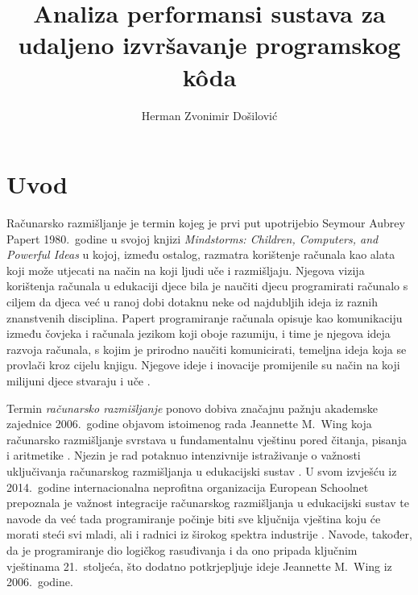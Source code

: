 \documentclass[times, utf8, diplomski]{fer}
\begin{document}

\title{Analiza performansi sustava za udaljeno izvršavanje programskog kôda}

\author{Herman Zvonimir Došilović}

\maketitle




\tableofcontents

\chapter{Uvod}
Računarsko razmišljanje  je termin kojeg je prvi put upotrijebio Seymour Aubrey Papert 1980.\ godine u svojoj knjizi \textit{Mindstorms: Children, Computers, and Powerful Ideas} \citep{10.5555/1095592} u kojoj, između ostalog, razmatra korištenje računala kao alata koji može utjecati na način na koji ljudi uče i razmišljaju. Njegova vizija korištenja računala u edukaciji djece bila je naučiti djecu programirati računalo s ciljem da djeca već u ranoj dobi dotaknu neke od najdubljih ideja iz raznih znanstvenih disciplina. Papert programiranje računala opisuje kao komunikaciju između čovjeka i računala jezikom koji oboje razumiju, i time je njegova ideja razvoja računala, s kojim je prirodno naučiti  komunicirati, temeljna ideja koja se provlači kroz cijelu knjigu. Njegove ideje i inovacije promijenile su način na koji milijuni djece stvaraju i uče \citep{Papert.MITMediaLab}.

Termin \textit{računarsko razmišljanje} ponovo dobiva značajnu pažnju akademske zajednice \citep{grover2013computational} 2006.\ godine objavom istoimenog rada Jeannette M.\ Wing  koja računarsko razmišljanje svrstava u fundamentalnu vještinu pored čitanja, pisanja i aritmetike \citep{wing2006computational}. Njezin je rad potaknuo intenzivnije istraživanje o važnosti uključivanja računarskog razmišljanja u edukacijski sustav \citep{lockwood2017computational}. U svom izvješću iz 2014.\ godine internacionalna neprofitna organizacija European Schoolnet prepoznala je važnost integracije računarskog razmišljanja u edukacijski sustav te navode da već tada programiranje počinje biti sve ključnija vještina koju će morati steći svi mladi, ali i radnici iz širokog spektra industrije \citep{balanskat2014computing}. Navode, također, da je programiranje dio logičkog rasuđivanja i da ono pripada ključnim vještinama 21.\ stoljeća, što dodatno potkrjepljuje ideje Jeannette M.\ Wing iz 2006.\ godine.
\end{document}
